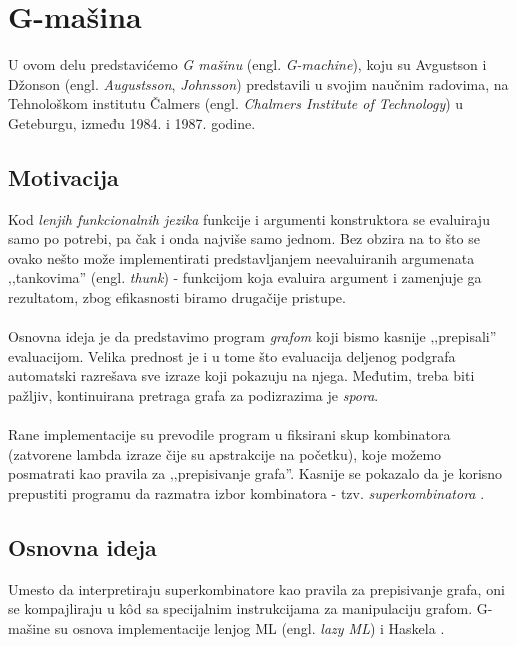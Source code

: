 \section{G-mašina}
\label{sec:Gmasine}

U ovom delu predstavićemo {\em G mašinu} (engl. \textit{G-machine}), koju su Avgustson i Džonson (engl. \textit{Augustsson}, \textit{Johnsson}) predstavili u svojim naučnim radovima, na Tehnološkom institutu Čalmers (engl. \textit{Chalmers Institute of Technology}) u Geteburgu, između 1984. i 1987. godine. 

\subsection{Motivacija}
Kod {\em lenjih funkcionalnih jezika} funkcije i argumenti konstruktora se evaluiraju samo po potrebi, pa čak i onda najviše samo jednom. Bez obzira na to što se ovako nešto može implementirati predstavljanjem neevaluiranih argumenata ‚‚tankovima'' (engl. \textit{thunk}) - funkcijom koja evaluira argument i zamenjuje ga rezultatom, zbog efikasnosti biramo drugačije pristupe. \\ 
\\Osnovna ideja je da predstavimo program {\em grafom} koji bismo kasnije ‚‚prepisali''  evaluacijom. Velika prednost je i u tome što evaluacija deljenog podgrafa automatski razrešava sve izraze koji pokazuju na njega. Međutim, treba biti pažljiv, kontinuirana pretraga grafa za podizrazima je {\em spora}. \\
\\
Rane implementacije su prevodile program u fiksirani skup kombinatora (zatvorene lambda izraze čije su apstrakcije na početku), koje možemo posmatrati kao pravila za ‚‚prepisivanje grafa''. Kasnije se pokazalo da je korisno prepustiti programu da razmatra izbor kombinatora - tzv. {\em superkombinatora} \cite{super-combinators}. \\ %


\subsection{Osnovna ideja} 
Umesto da interpretiraju superkombinatore kao pravila za prepisivanje grafa, oni se kompajliraju u k\^od sa specijalnim instrukcijama za manipulaciju grafom. G-mašine su osnova implementacije lenjog ML (engl. \textit{lazy ML}) \cite{lazy-ML} i Haskela \cite{hbc}.\\ 

